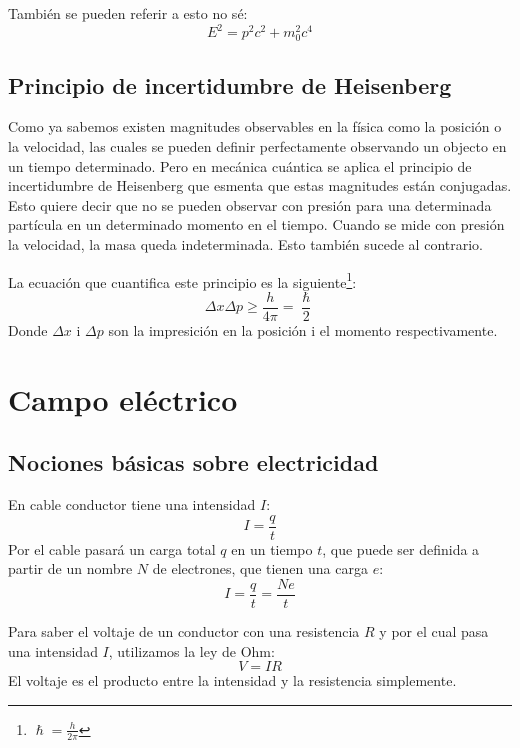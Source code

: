 \documentclass[arial,a4paper,print]{article}
\begin{document}
También se pueden referir a esto no sé:
\begin{equation*}
	E^{2} = p^{2}c^{2} + m_{0}^{2}c^{4}
\end{equation*}

\subsection{Principio de incertidumbre de Heisenberg}
Como ya sabemos existen magnitudes observables en la física como la posición o la velocidad, las cuales se pueden definir perfectamente observando un objecto en un tiempo determinado. Pero en mecánica cuántica se aplica el principio de incertidumbre de Heisenberg que esmenta que estas magnitudes están conjugadas. Esto quiere decir que no se pueden observar con presión para una determinada partícula en un determinado momento en el tiempo. Cuando se mide con presión la velocidad, la masa queda indeterminada. Esto también sucede al contrario. 

La ecuación que cuantifica este principio es la siguiente\footnote{$\hslash = \frac{h}{2\pi}$}:
\begin{equation*}
	\Delta x\Delta p \geq \frac{h}{4\pi} = \frac{\hslash}{2}
\end{equation*}
Donde $\Delta x$ i $\Delta p$ son la impresición en la posición i el momento respectivamente.

\pagebreak
\section{Campo eléctrico}

\subsection{Nociones básicas sobre electricidad}
En cable conductor tiene una intensidad $I$:
\begin{equation*}
	I = \frac{q}{t}
\end{equation*}
Por el cable pasará un carga total $q$ en un tiempo $t$, que puede ser definida a partir de un nombre $N$ de electrones, que tienen una carga $e$:
\begin{equation*}
	I = \frac{q}{t} = \frac{Ne}{t}
\end{equation*}

Para saber el voltaje de un conductor con una resistencia $R$ y por el cual pasa una intensidad $I$, utilizamos la ley de Ohm:
\begin{equation*}
	V = IR
\end{equation*}
El voltaje es el producto entre la intensidad y la resistencia simplemente.
\end{document}
